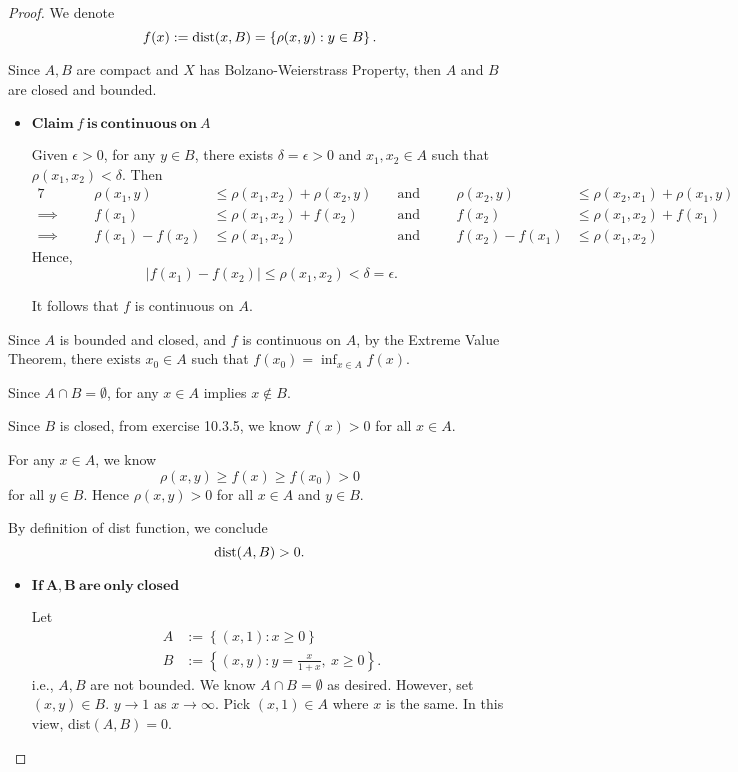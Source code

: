 \begin{Exercise}
\begin{proof}
We denote 
$$
f(x) 
:= {\rm dist}(x,B) 
= \left\{\rho(x,y):y\in B\right\}.
$$

Since $A,B$ are compact and $X$ has Bolzano-Weierstrass Property, then $A$ and $B$ are closed and bounded.
\begin{itemize}
\item $\mathbf{Claim\ \mathit{f}\ is\ continuous\ on\ \mathit{A}}$

Given $\epsilon>0$, for any $y\in B$, there exists $\delta = \epsilon > 0$ and $x_1, x_2\in A$ such that $\rho(x_1,x_2) < \delta$. Then 
\begin{alignat*}{7}
\quad&& \rho(x_1,y) &\leq \rho(x_1,x_2) + \rho(x_2, y)\quad&\text{and}\quad&& \rho(x_2,y) &\leq \rho(x_2,x_1) + \rho(x_1, y)  \\
\implies\quad&& f(x_1) &\leq \rho(x_1,x_2) + f(x_2)\quad&\text{and}\quad&& f(x_2) &\leq \rho(x_1,x_2) + f(x_1) \\
\implies\quad&& f(x_1)-f(x_2) &\leq \rho(x_1,x_2) \quad&\text{and}\quad&& f(x_2)-f(x_1) &\leq \rho(x_1,x_2)
\end{alignat*}
Hence,
$$
\left| f(x_1)-f(x_2) \right| \leq \rho(x_1, x_2) < \delta = \epsilon.
$$

It follows that $f$ is continuous on $A$.
\end{itemize}

Since $A$ is bounded and closed, and $f$ is continuous on $A$, by the Extreme Value Theorem, there exists $x_0\in A$ such that $f(x_0)=\inf_{x\in A}f(x)$.

Since $A\cap B = \emptyset$, for any $x\in A$ implies $x\notin B$. 

Since $B$ is closed, from exercise 10.3.5, we know $f(x) > 0$ for all $x\in A$. 

For any $x\in A$, we know
$$
\rho(x,y)
\geq f(x)
\geq f(x_0)
> 0
$$
for all $y\in B$. Hence $\rho(x,y) > 0$ for all $x\in A$ and $y\in B$. 

By definition of dist function, we conclude
$$
{\rm dist}(A,B) > 0.
$$

\begin{itemize}
\item $\mathbf{If\ A,B\ are\ only\ closed}$

Let
\begin{align*}
A &:= \left\{(x,1):x\geq 0\right\} \\
B &:= \left\{(x,y):y=\frac{x}{1+x},\ x\geq 0\right\}.
\end{align*}
i.e., $A,B$ are not bounded. We know $A\cap B=\emptyset$ as desired. However, set $(x, y) \in B$. $y\to 1$ as $x\to\infty$. Pick $(x, 1)\in A$ where $x$ is the same. In this view, dist$(A,B)=0$.
\end{itemize}
\end{proof}
\end{Exercise}